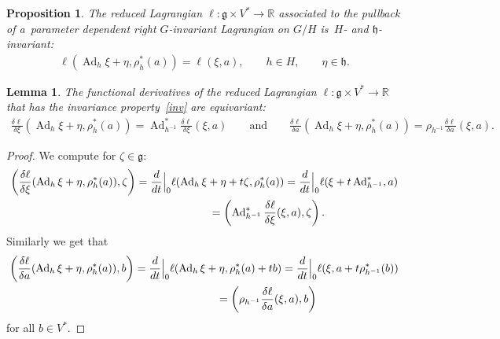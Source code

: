 \documentclass[10pt,a4paper]{amsart}
\numberwithin{equation}{section}
\newtheorem{Lemma}[Theorem]{Lemma}
\newtheorem{Proposition}[Theorem]{Proposition}
{ \theoremstyle{definition}
\newtheorem{Example}[Theorem]{Example}
\newtheorem{Remark}[Theorem]{Remark} }
\begin{document}
\begin{Proposition}
The reduced Lagrangian $\ell:\mathfrak g\times V^*\to\mathbb R$ associated to the pullback of a~parameter dependent
right $G$-invariant Lagrangian on $G/H$ is~$H$- and $\mathfrak h$-invariant:
\begin{gather}
\label{inv}
\ell(\operatorname{Ad}_h\xi+\eta,\rho^*_h(a))=\ell(\xi,a),
\qquad
h\in H,
\qquad
\eta\in\mathfrak h.
\end{gather}
\end{Proposition}

\begin{Lemma}
\label{barbar}
The functional derivatives of the reduced Lagrangian $\ell:\mathfrak g\times V^*\to\mathbb R$ that has the invariance
property~\eqref{inv} are equivariant:
\begin{gather*}
\frac{\delta\ell}{\delta\xi}(\operatorname{Ad}_h\xi+\eta,\rho^*_h(a))=\operatorname{Ad}^*_{h^{-1}}\frac{\delta
\ell}{\delta \xi}(\xi,a)
\qquad
\text{and}
\qquad
\frac{\delta\ell}{\delta a}(\operatorname{Ad}_h\xi+\eta,\rho^*_h(a))=\rho_{h^{-1}}\frac{\delta \ell}{\delta a}(\xi,a).
\end{gather*}
\end{Lemma}

\begin{proof}
We compute for $\zeta\in\mathfrak g$:
\begin{gather*}
\left(\frac{\delta\ell}{\delta\xi}(\operatorname{Ad}_h\xi+\eta,\rho^*_h(a)),\zeta\right)
 =\frac{d}{dt}\Big|_0\ell(\operatorname{Ad}_h\xi+\eta+t\zeta,\rho^*_h(a))
=\frac{d}{dt}\Big|_0\ell(\xi+t\operatorname{Ad}^*_{h^{-1}},a)
\\
\hphantom{\left(\frac{\delta\ell}{\delta\xi}(\operatorname{Ad}_h\xi+\eta,\rho^*_h(a)),\zeta\right)}{}
 =\left(\operatorname{Ad}^*_{h^{-1}}\frac{\delta\ell}{\delta\xi}(\xi,a),\zeta\right).
\end{gather*}
Similarly we get that
\begin{gather*}
\left(\frac{\delta\ell}{\delta a}(\operatorname{Ad}_h\xi+\eta,\rho^*_h(a)),b\right)
 =\frac{d}{dt}\Big|_0\ell(\operatorname{Ad}_h\xi+\eta,\rho^*_h(a)+tb)
=\frac{d}{dt}\Big|_0\ell(\xi,a+t\rho^*_{h^{-1}}(b))
\\
\hphantom{\left(\frac{\delta\ell}{\delta a}(\operatorname{Ad}_h\xi+\eta,\rho^*_h(a)),b\right)}{}
 =\left(\rho_{h^{-1}}\frac{\delta\ell}{\delta a}(\xi,a),b\right)
\end{gather*}
for all $b\in V^*$.
\end{proof}
\end{document}
